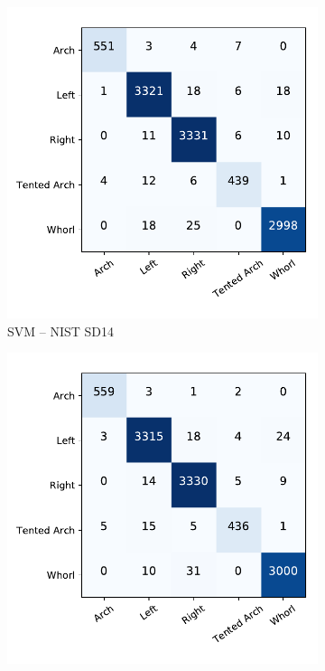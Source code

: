 \begin{figure}[!ht]
	\begin{subfigure}[b]{0.25\textwidth}
		\centering
		\includegraphics[width=\linewidth]{fig/figs/confusion_matrix_svm_sd14.pdf}
		\caption{SVM -- NIST SD14 }
		\label{fig.cnf_matrix_5class.svm_sd14}
	\end{subfigure}%
	\begin{subfigure}[b]{0.25\textwidth}
		\centering
		\includegraphics[width=\linewidth]{fig/figs/confusion_matrix_net_sd14.pdf}

\end{subfigure}
\end{figure}
